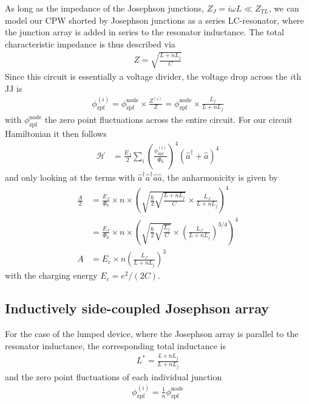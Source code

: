 As long as the impedance of the Josephson junctions, $Z_J=i\omega L\ll Z_{TL}$, we can model our CPW shorted by Josephson junctions as a series LC-resonator, where the junction array is added in series to the resonator inductance.
The total characteristic impedance is thus described via
\begin{align}
Z=\sqrt{\frac{L+nL_j}{C}}
\end{align}
Since this circuit is essentially a voltage divider, the voltage drop across the $i$th JJ is
\begin{align}
\phi_\text{zpf}^{(i)} = \phi_\text{zpf}^\text{node}\times\frac{Z^{(i)}}{Z}=\phi_\text{zpf}^\text{node}\times\frac{L_j}{L+n L_j}
\end{align}
with $\phi_\text{zpf}^\text{node}$ the zero point fluctuations across the entire circuit.
For our circuit Hamiltonian it then follows 
\begin{align}
\mathcal{H}&= \frac{E_J}{2} \sum_{i} \left( \frac{\phi_\text{zpf}^{(i)}}{\Phi_0} \right)^4 \left(\hat{a}^\dagger+\hat{a}\right)^4
\end{align}
and only looking at the terms with $\hat{a}^\dagger \hat{a}^\dagger \hat{a} \hat{a}$, the anharmonicity is given by
\begin{align}
\frac{A}{2} &=\frac{E_J}{\Phi_0}\times n \times \left(\sqrt{\frac{\hbar}{2} \sqrt{\frac{L+nL_j}{C}}}\times \frac{L_J}{L+nL_j}\right)^4  \\
&= \frac{E_J}{\Phi_0}\times n \times \left(\sqrt{\frac{\hbar}{2} \sqrt{\frac{L_j}{C}}}\times \left(\frac{L_J}{L+nL_j}\right)^{3/4}\right)^4  \\
A &= E_c \times n \left(\frac{L_J}{L+nL_j}\right)^{3}
\end{align}
with the charging energy $E_c=e^2/(2C)$.

\subsection{Inductively side-coupled Josephson array}\label{sec:lumped}

For the case of the lumped device, where the Josephson array is parallel to the resonator inductance, the corresponding total inductance is
\begin{align}
L^*=\frac{L \times nL_j}{L+nL_j}
\end{align}
and the zero point fluctuations of each individual junction
\begin{align}
\phi_\text{zpf}^{(i)}=\frac{1}{n}\phi_\text{zpf}^\text{node}
\end{align}

